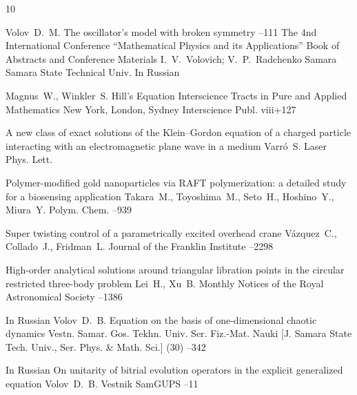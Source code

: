 \begin{thebibliography}{10}

\by  Volov~D.~M.
\paper  The oscillator’s model with broken symmetry
--111
\inbook  The 4nd International Conference ``Mathe\-ma\-tical Physics and its Applications''
\bookinfo Book of Abstracts and Conference Materials
\eds I.~V.~Volovich; V.~P.~Radchenko
\publaddr Samara
\publ Samara State Technical Univ.
\lang In Russian


\by Magnus~W., Winkler~S.
\book Hill's Equation
\serial Interscience Tracts in Pure and Applied Mathematics
\publaddr New York, London, Sydney
\publ Interscience Publ.
\totalpages viii+127


\paper A new class of exact solutions of the Klein–Gordon equation of a charged particle interacting with an electromagnetic plane wave in a medium
\by Varr\'{o}~S.
\jour Laser Phys. Lett.


\paper Polymer-modified gold nanoparticles via RAFT polymerization: a detailed study for a biosensing application
\by Takara~M., Toyoshima~M., Seto~H., Hoshino~Y., Miura~Y.
\jour Polym. Chem.
--939

\paper Super twisting control of a parametrically excited overhead crane
\by V\'{a}zquez~C., Collado~J., Fridman~L.
\jour Journal of the Franklin Institute
--2298


\paper High-order analytical solutions around triangular libration points in the circular restricted three-body
problem
\by Lei~H., Xu~B.
\jour Monthly Notices of the Royal Astronomical Society
--1386


\lang In Russian
\by Volov~D.~B.
\paper Equation on the basis of one-dimensional chaotic dynamics
\jour Vestn. Samar. Gos. Tekhn. Univ. Ser. Fiz.-Mat. Nauki \rm [J. Samara State Tech. Univ., Ser. Phys. \& Math. Sci.]
(30)
--342


\lang In Russian
\paper On unitarity of bitrial evolution operators in the explicit generalized equation
\by Volov~D.~B.
\jour Vestnik SamGUPS
--11




\end{thebibliography}
